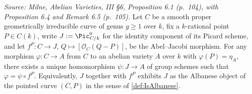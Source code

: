 \begin{theorem}
  \label{thm:albanese_universal_property_northstar}
  
  \textit{Source: Milne, Abelian Varieties, III \S 6, Proposition 6.1 (p.~104), with Proposition 6.4 and Remark 6.5 (p.~105).}
  Let \(C\) be a smooth proper geometrically irreducible curve of genus \(g \geq 1\) over \(k\), fix a \(k\)-rational point \(P \in C(k)\), write \(J := \Pic^0_{C/k}\) for the identity component of its Picard scheme, and let \(f^P \colon C \to J\), \(Q \mapsto [\mathcal O_C(Q - P)]\), be the Abel--Jacobi morphism. For any morphism \(\varphi \colon C \to A\) from \(C\) to an abelian variety \(A\) over \(k\) with \(\varphi(P) = \eta_A\), there exists a unique homomorphism \(\psi \colon J \to A\) of group schemes such that \(\varphi = \psi \circ f^P\). Equivalently, \(J\) together with \(f^P\) exhibits \(J\) as the Albanese object of the pointed curve \((C, P)\) in the sense of \cref{def:IsAlbanese}.
\end{theorem}
